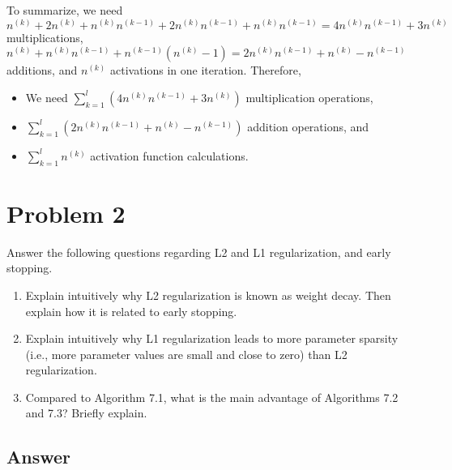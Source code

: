 \documentclass[
	12pt, %
]{../Template/fphw}
\begin{document}
\begin{enumerate}[label=(\arabic*)]
\begin{itemize}
\end{itemize}
To summarize, we need $n^{(k)} + 2n^{(k)}+n^{(k)}n^{(k-1)}+2n^{(k)}n^{(k-1)}+n^{(k)}n^{(k-1)}= 4n^{(k)}n^{(k-1)}+3n^{(k)}$ multiplications, $n^{(k)}+n^{(k)}n^{(k-1)}+n^{(k-1)}(n^{(k)}-1) = 2n^{(k)}n^{(k-1)}+n^{(k)}-n^{(k-1)}$ additions, and $n^{(k)}$ activations in one iteration. Therefore,
\begin{itemize}
\item We need $\sum_{k=1}^{l}\left(4n^{(k)}n^{(k-1)}+3n^{(k)}\right)$ multiplication operations,
\item $\sum_{k=1}^{l}\left(2n^{(k)}n^{(k-1)}+n^{(k)}-n^{(k-1)}\right)$ addition operations, and
\item $\sum_{k=1}^{l}n^{(k)}$ activation function calculations.
\end{itemize}

\end{enumerate}


\section*{Problem 2}

\begin{problem}
     Answer the following questions regarding L2 and L1 regularization, and early stopping.
     \begin{enumerate}[label = (\arabic*)]
        \item Explain intuitively why L2 regularization is known as weight decay. Then explain how it is related to early
        stopping.
        \item Explain intuitively why L1 regularization leads to more parameter sparsity (i.e., more parameter values are small
        and close to zero) than L2 regularization.
        \item Compared to Algorithm 7.1, what is the main advantage of Algorithms 7.2 and 7.3? Briefly explain.
    \end{enumerate}
\end{problem}


\subsection*{Answer}
\end{document}
